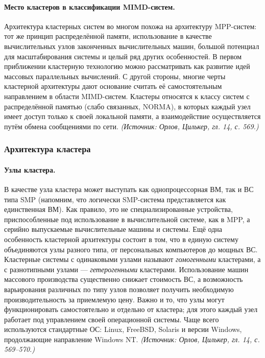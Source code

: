 \documentclass[a4paper,12pt]{article}
\begin{document}
\paragraph{Место кластеров в классификации MIMD-систем.}
Архитектура кластерных систем во многом похожа на архитектуру MPP-систем: тот же принцип распределённой памяти, использование в качестве вычислительных узлов законченных вычислительных машин, большой потенциал для масштабирования системы и целый ряд других особенностей. В первом приближении кластерную технологию можно рассматривать как развитие идей массовых параллельных вычислений. С другой стороны, многие черты кластерной архитектуры дают основание считать её самостоятельным направлением в области MIMD-систем. Кластеры относятся к классу систем с распределённой памятью (слабо связанных, NORMA), в которых каждый узел имеет доступ только к своей локальной памяти, а взаимодействие осуществляется путём обмена сообщениями по сети.
\textit{(Источник: Орлов, Цилькер, гл. 14, с. 569.)}

\subsubsection{Архитектура кластера}

\paragraph{Узлы кластера.}
В качестве узла кластера может выступать как однопроцессорная ВМ, так и ВС типа SMP (напомним, что логически SMP-система представляется как единственная ВМ). Как правило, это не специализированные устройства, приспособленные под использование в вычислительной системе, как в MPP, а серийно выпускаемые вычислительные машины и системы. Ещё одна особенность кластерной архитектуры состоит в том, что в единую систему объединяются узлы разного типа, от персональных компьютеров до мощных ВС. Кластерные системы с одинаковыми узлами называют \emph{гомогенными} кластерами, а с разнотипными узлами — \emph{гетерогенными} кластерами. Использование машин массового производства существенно снижает стоимость ВС, а возможность варьирования различных по типу узлов позволяет получить необходимую производительность за приемлемую цену. Важно и то, что узлы могут функционировать самостоятельно и отдельно от кластера; для этого каждый узел работает под управлением своей операционной системы. Чаще всего используются стандартные ОС: Linux, FreeBSD, Solaris и версии Windows, продолжающие направление Windows NT.
\textit{(Источник: Орлов, Цилькер, гл. 14, с. 569--570.)}
\end{document}
